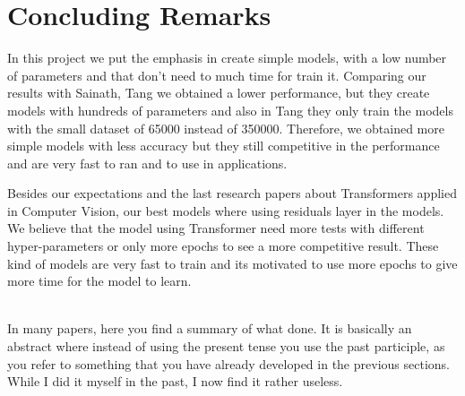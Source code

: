 
\section{Concluding Remarks}
\label{sec:conclusions}

In this project we put the emphasis in create simple models, with a low number of parameters and that don't need to much time for train it.
Comparing our results with Sainath, Tang we obtained a lower performance, but they create models with hundreds of parameters and also in Tang they only train the models with the small dataset of 65000 instead of 350000.
Therefore, we obtained more simple models with less accuracy but they still competitive in the performance and are very fast to ran and to use in applications.

Besides our expectations and the last research papers about Transformers applied in Computer Vision, our best models where using residuals layer in the models. We believe that the model using Transformer need more tests with different hyper-parameters or only more epochs to see a more competitive result. These kind of models are very fast to train and its motivated to use more epochs to give more time for the model to learn.

\\

In many papers, here you find a summary of what done. It is basically an abstract where instead of using the present tense you use the past participle, as you refer to something that you have already developed in the previous sections. While I did it myself in the past, I now find it rather useless.\\ 

\\

